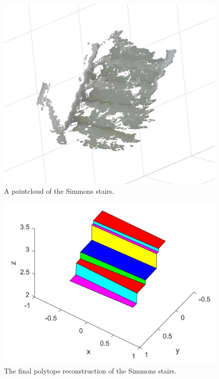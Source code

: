 \begin{figure}[!h]
\centering
\includegraphics[width=\columnwidth]{Sections/Figures/simmons-stairs-ptcloud.jpg}
\caption{A pointcloud of the Simmons stairs.}
\label{simmons-ptcloud}
\end{figure}

\begin{figure}[!h]
\centering
\includegraphics[width=\columnwidth]{Sections/Figures/simmons-stairs-diagonal-geom.jpg}
\caption{The final polytope reconstruction of the Simmons stairs. }
\label{simmons-polytope}
\end{figure}

